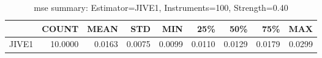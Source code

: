 \begin{table}[ht]
\centering
\caption{mse summary: Estimator=JIVE1, Instruments=100, Strength=0.40}
\begin{tabular}{lrrrrrrrr}
\toprule
 & COUNT & MEAN & STD & MIN & 25\% & 50\% & 75\% & MAX \\
\midrule
JIVE1 & 10.0000 & 0.0163 & 0.0075 & 0.0099 & 0.0110 & 0.0129 & 0.0179 & 0.0299 \\
\bottomrule
\end{tabular}
\end{table}
